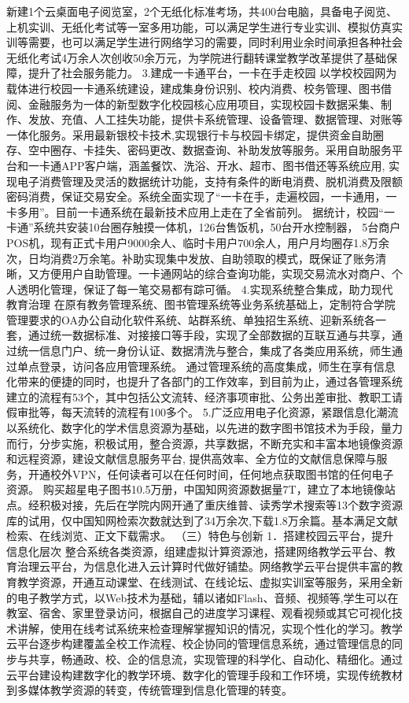 新建1个云桌面电子阅览室，2个无纸化标准考场，共400台电脑，具备电子阅览、上机实训、无纸化考试等一室多用功能，可以满足学生进行专业实训、模拟仿真实训等需要，也可以满足学生进行网络学习的需要，同时利用业余时间承担各种社会无纸化考试4万余人次创收50余万元，为学院进行翻转课堂教学改革提供了基础保障，提升了社会服务能力。
3.建成一卡通平台，一卡在手走校园
以学校校园网为载体进行校园一卡通系统建设，建成集身份识别、校内消费、校务管理、图书借阅、金融服务为一体的新型数字化校园核心应用项目，实现校园卡数据采集、制作、发放、充值、人工挂失功能，提供卡系统管理、设备管理、数据管理、对账等一体化服务。采用最新银校卡技术,实现银行卡与校园卡绑定，提供资金自助圈存、空中圈存、卡挂失、密码更改、数据查询、补助发放等服务。采用自助服务平台和一卡通APP客户端，涵盖餐饮、洗浴、开水、超市、图书借还等系统应用, 实现电子消费管理及灵活的数据统计功能，支持有条件的断电消费、脱机消费及限额密码消费，保证交易安全。系统全面实现了“一卡在手，走遍校园，一卡通用，一卡多用”。目前一卡通系统在最新技术应用上走在了全省前列。
据统计，校园“一卡通”系统共安装10台圈存触摸一体机，126台售饭机，50台开水控制器， 5台商户POS机，现有正式卡用户9000余人、临时卡用户700余人，用户月均圈存1.8万余次，日均消费2万余笔。补助实现集中发放、自助领取的模式，既保证了账务清晰，又方便用户自助管理。一卡通网站的综合查询功能，实现交易流水对商户、个人透明化管理，保证了每一笔交易都有踪可循。
4.实现系统整合集成，助力现代教育治理 
在原有教务管理系统、图书管理系统等业务系统基础上，定制符合学院管理要求的OA办公自动化软件系统、站群系统、单独招生系统、迎新系统各一套，通过统一数据标准、对接接口等手段，实现了全部数据的互联互通与共享，通过统一信息门户、统一身份认证、数据清洗与整合，集成了各类应用系统，师生通过单点登录，访问各应用管理系统。
通过管理系统的高度集成，师生在享有信息化带来的便捷的同时，也提升了各部门的工作效率，到目前为止，通过各管理系统建立的流程有53个，其中包括公文流转、经济事项审批、公务出差审批、教职工请假审批等，每天流转的流程有100多个。
5.广泛应用电子化资源，紧跟信息化潮流
以系统化、数字化的学术信息资源为基础，以先进的数字图书馆技术为手段，量力而行，分步实施，积极试用，整合资源，共享数据，不断充实和丰富本地镜像资源和远程资源，建设文献信息服务平台, 提供高效率、全方位的文献信息保障与服务，开通校外VPN，任何读者可以在任何时间，任何地点获取图书馆的任何电子资源。 
购买超星电子图书10.5万册，中国知网资源数据量7T，建立了本地镜像站点。经积极对接，先后在学院内网开通了重庆维普、读秀学术搜索等13个数字资源库的试用，仅中国知网检索次数就达到了34万余次,下载1.8万余篇。基本满足文献检索、在线浏览、正文下载需求。
（三）特色与创新
1．搭建校园云平台，提升信息化层次
整合系统各类资源，组建虚拟计算资源池，搭建网络教学云平台、教育治理云平台，为信息化进入云计算时代做好铺垫。网络教学云平台提供丰富的教育教学资源，开通互动课堂、在线测试、在线论坛、虚拟实训室等服务，采用全新的电子教学方式，以Web技术为基础，辅以诸如Flash、音频、视频等,学生可以在教室、宿舍、家里登录访问，根据自己的进度学习课程、观看视频或其它可视化技术讲解，使用在线考试系统来检查理解掌握知识的情况，实现个性化的学习。教学云平台逐步构建覆盖全校工作流程、校企协同的管理信息系统，通过管理信息的同步与共享，畅通政、校、企的信息流，实现管理的科学化、自动化、精细化。通过云平台建设构建数字化的教学环境、数字化的管理手段和工作环境，实现传统教材到多媒体教学资源的转变，传统管理到信息化管理的转变。
